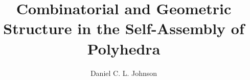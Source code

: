 \documentclass[12pt,twoside]{report}  %
\title{Combinatorial and Geometric Structure in the Self-Assembly of Polyhedra
}
\author{Daniel C. L. Johnson}
\begin{document}
\doublespacing
\begin{preliminaries}
\maketitle

\copyrightpage

\begin{signature}
\end{signature}

\begin{vita}
  
\end{vita}

\begin{acknowledgments}
  
\end{acknowledgments}

\begin{abstract}
  
  \thispagestyle{empty}
\end{abstract}

\begin{spacing}{1}
  \tableofcontents
  \clearpage{\pagestyle{empty}\cleardoublepage}

  \footnotesize
  \fontsize{11.5pt}{12.5pt}\selectfont
  \listoftables
  \clearpage{\pagestyle{empty}\cleardoublepage}

  \listoffigures
  \clearpage{\pagestyle{empty}\cleardoublepage}
  \normalsize
\end{spacing}

\end{preliminaries}

\pagestyle{myheadings}

\newtheorem{mythm}{Theorem}
\newtheorem{mylem}{Lemma}
\newtheorem{mycor}{Corollary}
\newtheorem{mydef}{Definition}

\newcommand{\colorA}{white}
\newcommand{\colorB}{black}
\newcommand{\colorAsm}{w}
\newcommand{\colorBsm}{b}
\newcommand{\poly}{$\mathscr{P}$}
\newcommand{\Poly}{\mathscr{P}}
\newcommand{\PolyGraph}{\textswab{G}}
\newcommand{\faceset}{F\left(\mathscr{P}\right)}
\newcommand{\spc}{ }
\newcommand{\xj}{$x^j$}
\newcommand{\xk}{$x^k$}
\newcommand{\Sjk}{$S_{jk}$}
\newcommand{\Skj}{$S_{kj}$}
\newcommand{\G}{{G}}
\end{document}
